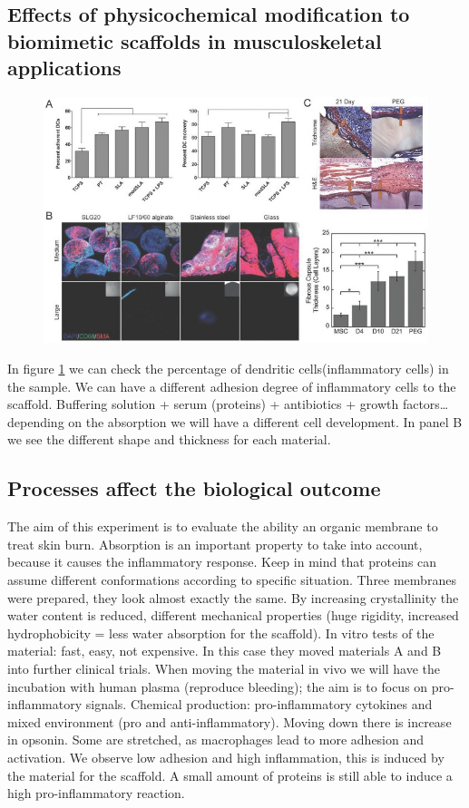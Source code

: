 \subsection{Effects of physicochemical modification to biomimetic scaffolds in musculoskeletal applications}
\begin{figure}[h]
\includegraphics[width=1\textwidth]{muscosk}
\caption{\label{fig:muscosk}}
\end{figure}
In figure \ref{fig:muscosk} we can check the percentage of dendritic cells(inflammatory cells) in the sample. 
We can have a different adhesion degree of inflammatory cells to the scaffold. 
Buffering solution + serum (proteins) + antibiotics + growth factors…depending on the absorption we will have a different cell development. 
In panel B we see the different shape and thickness for each material.

\subsection{Processes affect the biological outcome}
The aim of this experiment is to evaluate the ability an organic membrane to treat skin burn. Absorption is an important property to take into account, because it causes the inflammatory response. 
Keep in mind that proteins can assume different conformations according to specific situation. Three membranes were prepared, they look almost exactly the same. 
By increasing crystallinity the water content is reduced, different mechanical properties (huge rigidity, increased hydrophobicity = less water absorption for the scaffold). 
In vitro tests of the material: fast, easy, not expensive. 
In this case they moved materials A and B into further clinical trials. When moving the material in vivo we will have the incubation with human plasma (reproduce bleeding); the aim is to focus on pro-inflammatory signals.
Chemical production: pro-inflammatory cytokines and mixed environment (pro and anti-inflammatory). Moving down there is increase in opsonin.  Some are stretched, as macrophages lead to more adhesion and activation. 
We observe low adhesion and high inflammation, this is induced by the material for the scaffold. A small amount of proteins is still able to induce a high pro-inflammatory reaction. 

